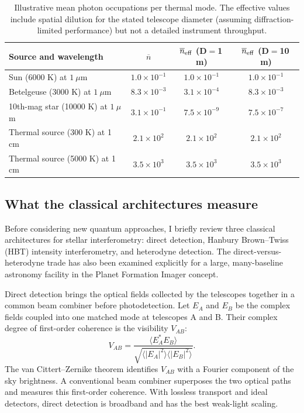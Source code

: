 \documentclass[]{spie}
\newcommand{\nbar}{\overline{n}}
\begin{document}
\begin{table}[ht]
\caption{Illustrative mean photon occupations per thermal mode. The effective values include spatial dilution for the stated telescope diameter (assuming diffraction-limited performance) but not a detailed instrument throughput.}
\label{tab:occupation}
\centering
\small
\begin{tabular}{lccc}
\toprule
Source and wavelength & $\nbar$ & $\nbar_{\rm eff}$ (D$=$1\,m) & $\nbar_{\rm eff}$ (D$=$10\,m) \\
\midrule
Sun (6000 K) at $1~\mu$m            & $1.0\times10^{-1}$ & $1.0\times10^{-1}$ & $1.0\times10^{-1}$ \\
\addlinespace[2pt]
Betelgeuse (3000 K) at $1~\mu$m     & $8.3\times10^{-3}$ & $3.1\times10^{-4}$ & $8.3\times10^{-3}$ \\
\addlinespace[2pt]
10th-mag star (10000 K) at $1~\mu$m & $3.1\times10^{-1}$ & $7.5\times10^{-9}$ & $7.5\times10^{-7}$ \\
\addlinespace[2pt]
Thermal source (300 K) at 1 cm      & $2.1\times10^{2}$  & $2.1\times10^{2}$  & $2.1\times10^{2}$ \\
\addlinespace[2pt]
Thermal source (5000 K) at 1 cm     & $3.5\times10^{3}$  & $3.5\times10^{3}$  & $3.5\times10^{3}$ \\
\bottomrule
\end{tabular}
\end{table}

\subsection{What the classical architectures measure}

Before considering new quantum approaches, I briefly review three classical architectures for stellar interferometry: direct detection, Hanbury Brown--Twiss (HBT) intensity interferometry, and heterodyne detection. The direct-versus-heterodyne trade has also been examined explicitly for a large, many-baseline astronomy facility in the Planet Formation Imager concept.\cite{irelandmonnier2014}

Direct detection brings the optical fields collected by the telescopes together in a common beam combiner before photodetection. Let $E_A$ and $E_B$ be the complex fields coupled into one matched mode at telescopes A and B. Their complex degree of first-order coherence is the visibility $V_{AB}$:
\begin{equation}
    V_{AB}=\frac{\langle E_A^*E_B\rangle}
    {\sqrt{\langle |E_A|^2\rangle\langle |E_B|^2\rangle}}.
    \label{eq:visibility}
\end{equation}
The van Cittert--Zernike theorem identifies $V_{AB}$ with a Fourier component of the sky brightness. A conventional beam combiner superposes the two optical paths and measures this first-order coherence. With lossless transport and ideal detectors, direct detection is broadband and has the best weak-light scaling.
\end{document}
